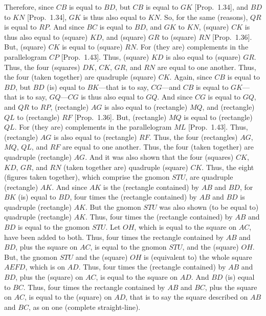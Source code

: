 Therefore, since $CB$ is equal to $BD$, but $CB$ is equal to $GK$ [Prop.~1.34], and $BD$ to
$KN$ [Prop.~1.34], $GK$ is thus also equal to $KN$. So, for the same (reasons), $QR$ is equal
to $RP$. And since $BC$ is equal to $BD$, and $GK$ to $KN$, (square) $CK$ is thus
also equal to (square) $KD$, and (square) $GR$ to (square) $RN$ [Prop.~1.36]. But,
(square) $CK$ is equal to (square) $RN$. For (they are) complements
in the parallelogram $CP$ [Prop.~1.43]. Thus, (square) $KD$ is also equal
to (square) $GR$. Thus, the four (squares)
$DK$, $CK$, $GR$, and $RN$ are equal to one another. Thus, the four (taken
together) are quadruple (square) $CK$. Again, since $CB$ is equal to $BD$, but
$BD$ (is) equal to $BK$---that is to say, $CG$---and $CB$ is equal to $GK$---that is
to say, $GQ$---$CG$ is thus also equal to $GQ$. And since
$CG$ is equal to $GQ$, and $QR$ to $RP$, (rectangle) $AG$ is also equal to
(rectangle) $MQ$, and (rectangle) $QL$ to (rectangle) $RF$ [Prop.~1.36]. But, (rectangle)
$MQ$ is equal to (rectangle) $QL$. For (they are) complements in the parallelogram $ML$ [Prop.~1.43]. Thus, 
(rectangle) $AG$ is also equal  to (rectangle) $RF$. Thus, the four (rectangles) $AG$, $MQ$, $QL$, and $RF$ are equal
to one another. Thus, the four (taken together)
 are quadruple (rectangle)
$AG$. And it was also shown that the four (squares)
$CK$, $KD$, $GR$, and $RN$ (taken together are) quadruple (square) $CK$. 
Thus, the eight (figures taken together), which comprise the gnomon $STU$,
are quadruple (rectangle) $AK$. And since $AK$ is the (rectangle contained)
by $AB$ and $BD$, for $BK$ (is) equal to $BD$, four times the (rectangle contained)
by $AB$ and $BD$ is quadruple (rectangle) $AK$. But the gnomon $STU$ was also shown (to be equal to) quadruple (rectangle)
$AK$. Thus, four times the
(rectangle contained) by $AB$ and $BD$ is equal to the gnomon $STU$. 
Let $OH$, which is equal to the square on $AC$,  have been added to both.  
Thus, four times  the
rectangle contained by $AB$ and $BD$, plus the square on $AC$, is equal to
the gnomon $STU$, and the (square) $OH$. But, the  gnomon $STU$
and the (square) $OH$ is (equivalent to) the whole square $AEFD$, which is on
$AD$. Thus, four times the (rectangle contained) by $AB$ and $BD$, plus
the (square) on $AC$, is equal to the square on $AD$.
And $BD$ (is) equal to $BC$. Thus, four times the rectangle contained by $AB$ and $BC$, plus the square on $AC$, is equal to the (square) on $AD$, that is to
say the square described on $AB$ and $BC$,  as on one (complete straight-line).

